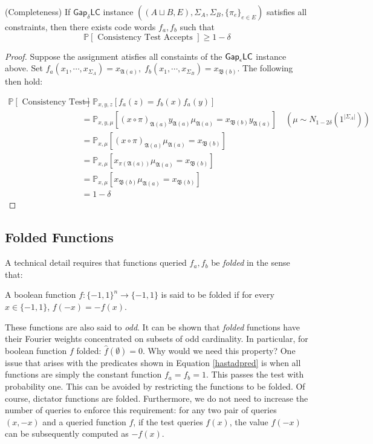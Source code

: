 \begin{proposition} (Completeness)
  If $\mathsf{Gap}_\delta\mathsf{LC}$ instance $((A\sqcup B,E),\Sigma_A,\Sigma_B,\{\pi_e\}_{e \in E})$ satisfies all constraints, then there exists code words $f_a, f_b$ such that
  \begin{equation}
    \mathbb{P}[ \text{ Consistency Test Accepts } ] \geq 1 - \delta
  \end{equation}
\end{proposition}
\begin{proof}
  Suppose the assignment atisfies all constaints of the $\mathsf{Gap}_\epsilon\mathsf{LC}$ instance above. Set $f_a(x_1,\cdots, x_{\Sigma_A}) = x_{\mathfrak{A}(a)}, \; f_b(x_1,\cdots, x_{\Sigma_B}) = x_{\mathfrak{B}(b)}$. The following then hold:

  \begin{align*}
      \mathbb{P}[ \text{ Consistency Test Accepts } ] & = \mathbb{P}_{x,y,z}\left[f_a(z) = f_b(x)f_a(y) \right] \\
      & = \mathbb{P}_{x,y, \mu}\left[ (x \circ \pi)_{\mathfrak{A}(a)}y_{\mathfrak{A}(a)}\mu_{\mathfrak{A}(a)} = x_{\mathfrak{B}(b)}y_{\mathfrak{A}(a)}  \right] \quad (\mu \sim N_{1 - 2\delta}(1^{|\Sigma_A|})) \\
      & = \mathbb{P}_{x,\mu} \left[(x \circ \pi)_{\mathfrak{A}(a)}\mu_{\mathfrak{A}(a)} = x_{\mathfrak{B}(b)} \right] \\
      & =  \mathbb{P}_{x,\mu} \left[x_{\pi(\mathfrak{A}(a))}\mu_{\mathfrak{A}(a)} = x_{\mathfrak{B}(b)} \right]\\
      & =  \mathbb{P}_{x,\mu} \left[x_{\mathfrak{B}(b)}\mu_{\mathfrak{A}(a)} = x_{\mathfrak{B}(b)} \right] \\
      & = 1 - \delta
  \end{align*}
\end{proof}
%
%

\subsection{Folded Functions}
A technical detail requires that functions queried $f_a,f_b$ be \emph{folded} in the sense that:
%
\begin{definition}
A boolean function $f:\{-1,1\}^n \rightarrow \{-1,1\}$ is said to be folded if for every $x \in \{-1,1\}$, $f(-x) = -f(x)$.
\end{definition}

These functions are also said to \emph{odd}. It can be shown that \emph{folded} functions have their Fourier weights concentrated on subsets of odd cardinality. In particular, for boolean function $f$ folded: $\widehat{f}(\emptyset) = 0$. Why would we need this property? One issue that arises with the predicates shown in Equation \ref{hastadpred} is when all functions are simply the constant function $f_a = f_b = 1$. This passes the test with probability one. This can be avoided by restricting the functions to be folded. Of course, dictator functions are folded. Furthermore, we do not need to increase the number of queries to enforce this requirement: for any two pair of queries $(x,-x)$ and a queried function $f$, if the test queries $f(x)$, the value $f(-x)$ can be subsequently computed as $-f(x)$.   

